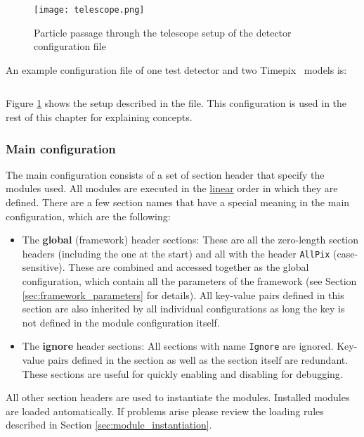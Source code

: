 \begin{figure}[t]
  \centering
  \texttt{[image: telescope.png]}
  \caption{Particle passage through the telescope setup of the detector configuration file}
  \label{fig:telescope}
\end{figure}

An example configuration file of one test detector and two Timepix~\cite{timepix} models is: 
\inputminted[frame=single,framesep=3pt,breaklines=true,tabsize=2,linenos]{ini}{../../etc/manual_detector.conf}
Figure \ref{fig:telescope} shows the setup described in the file. This configuration is used in the rest of this chapter for explaining concepts.

\subsubsection{Main configuration}
\label{sec:main_config}
The main configuration consists of a set of section header that specify the modules used. All modules are executed in the \underline{linear} order in which they are defined. There are a few section names that have a special meaning in the main configuration, which are the following:
\begin{itemize}
\item The \textbf{global} (framework) header sections: These are all the zero-length section headers (including the one at the start) and all with the header \texttt{AllPix} (case-sensitive). These are combined and accessed together as the global configuration, which contain all the parameters of the framework (see Section \ref{sec:framework_parameters} for details). All key-value pairs defined in this section are also inherited by all individual configurations as long the key is not defined in the module configuration itself.
\item The \textbf{ignore} header sections: All sections with name \texttt{Ignore} are ignored. Key-value pairs defined in the section as well as the section itself are redundant. These sections are useful for quickly enabling and disabling for debugging.
\end{itemize}
All other section headers are used to instantiate the modules. Installed modules are loaded automatically. If problems arise please review the loading rules described in Section \ref{sec:module_instantiation}.

